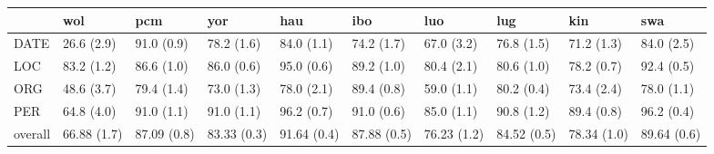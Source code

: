 \begin{tabular}{llllllllll}
\toprule
{} &          wol &          pcm &          yor &          hau &          ibo &          luo &          lug &          kin &          swa \\
\midrule
DATE    &   26.6 (2.9) &   91.0 (0.9) &   78.2 (1.6) &   84.0 (1.1) &   74.2 (1.7) &   67.0 (3.2) &   76.8 (1.5) &   71.2 (1.3) &   84.0 (2.5) \\
LOC     &   83.2 (1.2) &   86.6 (1.0) &   86.0 (0.6) &   95.0 (0.6) &   89.2 (1.0) &   80.4 (2.1) &   80.6 (1.0) &   78.2 (0.7) &   92.4 (0.5) \\
ORG     &   48.6 (3.7) &   79.4 (1.4) &   73.0 (1.3) &   78.0 (2.1) &   89.4 (0.8) &   59.0 (1.1) &   80.2 (0.4) &   73.4 (2.4) &   78.0 (1.1) \\
PER     &   64.8 (4.0) &   91.0 (1.1) &   91.0 (1.1) &   96.2 (0.7) &   91.0 (0.6) &   85.0 (1.1) &   90.8 (1.2) &   89.4 (0.8) &   96.2 (0.4) \\
overall &  66.88 (1.7) &  87.09 (0.8) &  83.33 (0.3) &  91.64 (0.4) &  87.88 (0.5) &  76.23 (1.2) &  84.52 (0.5) &  78.34 (1.0) &  89.64 (0.6) \\
\bottomrule
\end{tabular}

